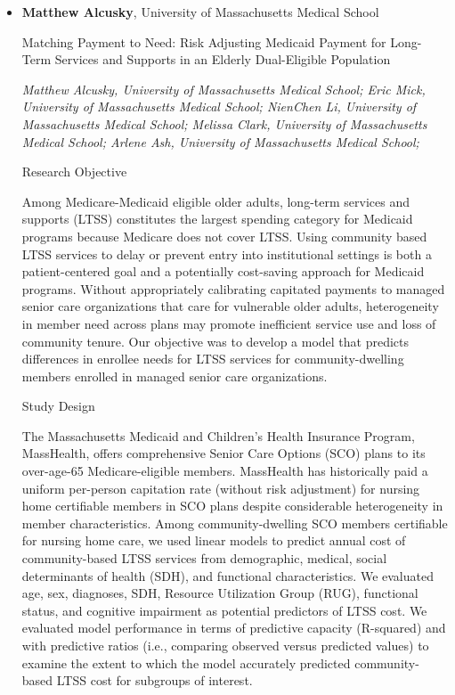 \begin{itemize}
\item \textbf{Matthew Alcusky}, University of Massachusetts Medical School

Matching Payment to Need: Risk Adjusting Medicaid Payment for Long-Term Services and Supports in an Elderly Dual-Eligible Population

\emph{\footnotesize Matthew Alcusky, University of Massachusetts Medical School; Eric Mick, University of Massachusetts Medical School; NienChen Li, University of Massachusetts Medical School; Melissa Clark, University of Massachusetts Medical School; Arlene Ash, University of Massachusetts Medical School;}

Research Objective

Among Medicare-Medicaid eligible older adults, long-term services and supports (LTSS) constitutes the largest spending category for Medicaid programs because Medicare does not cover LTSS. Using community based LTSS services to delay or prevent entry into institutional settings is both a patient-centered goal and a potentially cost-saving approach for Medicaid programs. Without appropriately calibrating capitated payments to managed senior care organizations that care for vulnerable older adults, heterogeneity in member need across plans may promote inefficient service use and loss of community tenure. Our objective was to develop a model that predicts differences in enrollee needs for LTSS services for community-dwelling members enrolled in managed senior care organizations.

Study Design

The Massachusetts Medicaid and Children’s Health Insurance Program, MassHealth, offers comprehensive Senior Care Options (SCO) plans to its over-age-65 Medicare-eligible members. MassHealth has historically paid a uniform per-person capitation rate (without risk adjustment) for nursing home certifiable members in SCO plans despite considerable heterogeneity in member characteristics. Among community-dwelling SCO members certifiable for nursing home care, we used linear models to predict annual cost of community-based LTSS services from demographic, medical, social determinants of health (SDH), and functional characteristics. We evaluated age, sex, diagnoses, SDH, Resource Utilization Group (RUG), functional status, and cognitive impairment as potential predictors of LTSS cost. We evaluated model performance in terms of predictive capacity (R-squared) and with predictive ratios (i.e., comparing observed versus predicted values) to examine the extent to which the model accurately predicted community-based LTSS cost for subgroups of interest. 


\end{itemize}
